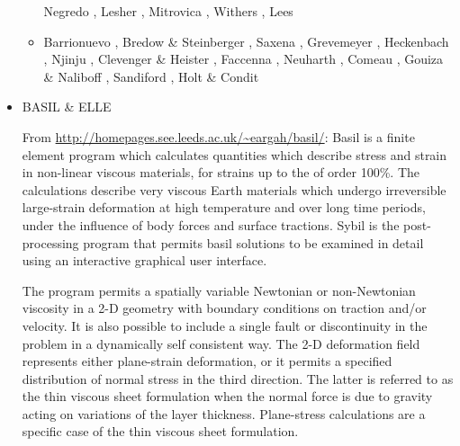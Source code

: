 \begin{itemize}
\begin{scriptsize}
\begin{itemize}
                          Negredo \etal \cite{nemc20}, Lesher \etal \cite{ledb20},
                          Mitrovica \etal \cite{miac20}, Withers \cite{with20},
                          Lees \etal \cite{lerm20}
\item[\twothousandtwentyone] Barrionuevo \etal \cite{balm21}, Bredow \& Steinberger \cite{brst21},
                             Saxena \etal \cite{sacp21}, Grevemeyer \etal \cite{grrm21},
                             Heckenbach \etal \cite{hebg21}, Njinju \etal \cite{njsn21}, 
                             Clevenger \& Heister \cite{clhe21}, Faccenna \etal \cite{fabh21},
                             Neuharth \etal \cite{nebg21}, Comeau \etal \cite{cosb21},
                             Gouiza \& Naliboff \cite{gona21}, Sandiford \etal \cite{sabg21},
                             Holt \& Condit \cite{hoco21}
\end{itemize}
\end{scriptsize}

\item {\codefont BASIL \& ELLE} 

From \url{http://homepages.see.leeds.ac.uk/~eargah/basil/}:
Basil is a finite element program which calculates quantities which describe  stress  and strain in non-linear viscous materials, for strains up to the of order 100\%.   
The calculations  describe  very  viscous  Earth materials which undergo irreversible large-strain 
deformation at  high  temperature  and over long time periods, under the influence of body 
forces and surface tractions.  Sybil  is the post-processing program that permits basil 
solutions to be examined in detail using an interactive graphical user interface.

The program permits a spatially variable Newtonian  or  non-Newtonian  viscosity  in a 2-D 
geometry with boundary conditions on traction and/or velocity.  It is also  possible  
to include  a single fault or discontinuity in the problem in a dynamically self consistent way.  
The 2-D deformation  field represents  either plane-strain deformation, or it permits 
a specified distribution of normal stress in the third  direction.   The  latter is referred 
to as the thin viscous sheet formulation when the normal force is due to  gravity  acting on 
variations of the layer thickness.  Plane-stress calculations are a specific case of 
the thin viscous sheet formulation.


\end{itemize}

